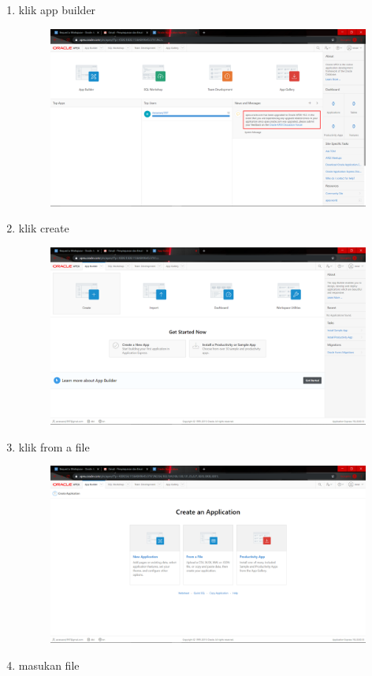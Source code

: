 \begin{enumerate}
\item klik app builder
\begin{figure}[H]
    \centering
    \includegraphics[scale=0.1]{figures/9}
    \caption{}
    \label{Figureanaconda8}
\end{figure}

\item klik create 
\begin{figure}[H]
    \centering
    \includegraphics[scale=0.1]{figures/10}
    \caption{}
    \label{Figureanaconda70}
\end{figure}

\item klik from a file

\begin{figure}[H]
    \centering
    \includegraphics[scale=0.1]{figures/11}
    \caption{}
    \label{Figureanaconda70}
\end{figure}
\item masukan file 


\end{enumerate}
